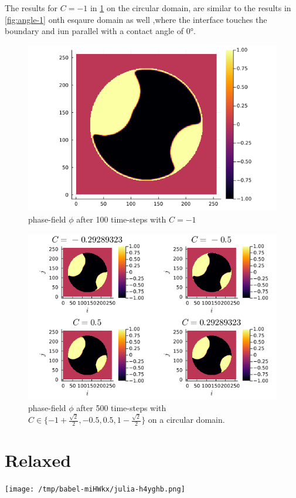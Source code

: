 \documentclass{mimosis}
\begin{document}
The results for \(C=-1\) in \ref{fig:angle-1c} on the circular domain, are similar to the results in \ref{fig:angle-1}  onth esqaure domain as well ,where the interface touches the boundary and iun parallel with a contact angle of 0°.
\begin{figure}[htbp]
\centering
\includegraphics[width=.9\linewidth]{images/angle-1c.png}
\caption{\label{fig:angle-1c}phase-field \(\phi\) after 100 time-steps with \(C=-1\)}
\end{figure}


\begin{figure}[htbp]
\centering
\includegraphics[width=.9\linewidth]{images/angle-multiplec.png}
\caption{\label{fig:angle-multiplec}phase-field \(\phi\) after 500 time-steps with \(C \in \{-1 + \frac{\sqrt{2}}{2} , -0.5 , 0.5 , 1 - \frac{\sqrt{2}}{2} \}\) on a circular domain.}
\end{figure}
\chapter{Relaxed}
\label{sec:orgae0d4d4}
\begin{center}
\texttt{[image: /tmp/babel-miHWkx/julia-h4yghb.png]}
\label{}
\end{center}
\end{document}
